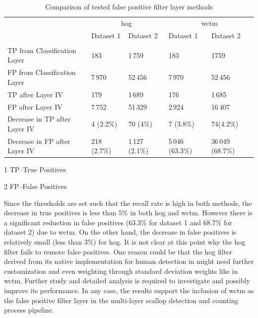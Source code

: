 \documentclass {udthesis}
\begin{document}
\begin{table}
  \centering
  \begin{threeparttable}
    \begin{tabular}{lllll}
\toprule[1pt]
	&\multicolumn{2}{c}{\gls{hog}}	&\multicolumn{2}{c}{\gls{wctm}}\\
	&Dataset 1	&Dataset 2	&Dataset 1	&Dataset 2\\ [2pt]\cline{1-5}\\[-5pt]
TP\tnote{1} from Classification Layer	&183		&1\,759		&183		&1759\\
FP\tnote{2} from Classification Layer	&7\,970		&52\,456		&7\,970		&52\,456\\
TP after Layer IV 			&179		&1\,689		&176		&1\,685\\
FP after Layer IV 			&7\,752		&51\,329		&2\,924		&16\,407\\
Decrease in TP after Layer IV	&4 (2.2\%)	&70 (4\%)	&7 (3.8\%)	&74(4.2\%)\\
Decrease in FP after Layer IV	&218 (2.7\%)	&1\,127 (2.1\%)	&5\,046 (63.3\%)	&36\,049 (68.7\%)\\ \bottomrule
    \end{tabular}
    \begin{tablenotes}
	  \item[1] \footnotesize{TP--True Positives}
	  \item[2] \footnotesize{FP--False Positives}
    \end{tablenotes}                                                      
  \end{threeparttable}
  \caption{Comparison of tested false positive filter layer methods}
  \label{tab:false_positives}
\end{table}      
%
Since the thresholds are set such that the recall rate is high in both methods, the decrease in true positives is less than 5\% in both \gls{hog} and \gls{wctm}. 
However there is a significant reduction in false positives (63.3\% for dataset 1 and 68.7\% for dataset 2)  due to \gls{wctm}. 
On the other hand, the decrease in false positives is relatively small (less than 3\%) for \gls{hog}.
It is not clear at this point why the \gls{hog} filter fails to remove  false positives. 
One reason could be that the \gls{hog} filter derived from its native implementation for human detection in \cite{dalal} might need further customization and even weighting through standard deviation weights like in \gls{wctm}. 
Further study and detailed analysis is required to investigate and possibly improve its performance. 
In any case, the results support the inclusion of \gls{wctm} as the false positive filter layer in the multi-layer scallop detection and counting process pipeline.
\end{document}
